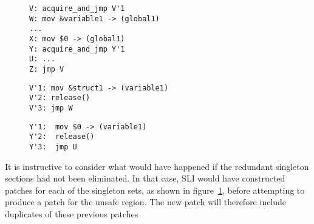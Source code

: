 \documentclass[10pt,twocolumn,preprint,natbib,authoryear]{sigplanconf}
\makeatletter
\newenvironment{subfloat}%
    {\def\caption##1{\gdef\subcapsave{\relax##1}}%
     \let\subcapsave=\@empty %
     \let\sf@oldlabel=\label
     \def\label##1{\xdef\sublabsave{\noexpand\label{##1}}}%
     \let\sublabsave\relax    %
     \setbox\subfigbox\hbox
       \bgroup}%
      {\egroup                %
     \let\label=\sf@oldlabel
     \subfigure[\subcapsave]{\box\subfigbox}}%
\makeatother
\begin{document}
\begin{figure}
  \begin{subfloat}
    \begin{minipage}{90mm}
\begin{verbatim}
V: acquire_and_jmp V'1
W: mov &variable1 -> (global1)
...
X: mov $0 -> (global1)
Y: acquire_and_jmp Y'1
U: ...
Z: jmp V
\end{verbatim}
    \end{minipage}
  \end{subfloat}
  \begin{subfloat}
    \begin{minipage}{90mm}
\begin{verbatim}
V'1: mov &struct1 -> (variable1)
V'2: release()
V'3: jmp W
\end{verbatim}
    \end{minipage}
  \end{subfloat}
  \begin{subfloat}
    \begin{minipage}{90mm}
\begin{verbatim}
Y'1:  mov $0 -> (variable1)
Y'2:  release()
Y'3:  jmp U
\end{verbatim}
    \end{minipage}
  \end{subfloat}
  \caption{Partial patch based on the state machine in figure~\ref{fig:specialise_taken}.}
  \label{fig:patch1}
\end{figure}

It is instructive to consider what would have happened if the
redundant singleton sections had not been eliminated.  In that case,
SLI would have constructed patches for each of the singleton sets, as
shown in figure~\ref{fig:patch1}, before attempting to produce a patch
for the unsafe region.  The new patch will therefore include
duplicates of these previous patches
\end{document}
